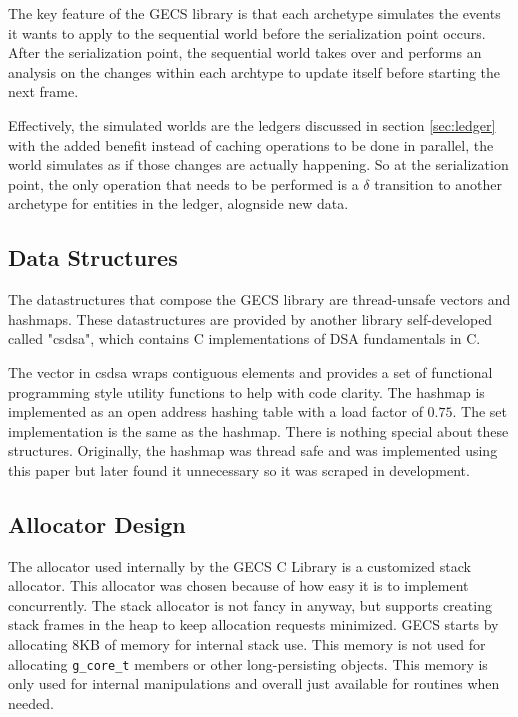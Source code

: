The key feature of the GECS library is that each archetype simulates the events it wants to apply to the sequential world before the serialization point occurs. After the serialization point, the sequential world takes over and performs an analysis on the changes within each archtype to update itself before starting the next frame.

Effectively, the simulated worlds are the ledgers discussed in section \ref{sec:ledger} with the added benefit instead of caching operations to be done in parallel, the world simulates as if those changes are actually happening. So at the serialization point, the only operation that needs to be performed is a $\delta$ transition to another archetype for entities in the ledger, alognside new data.

\subsection{Data Structures}
\label{sec:ds}
The datastructures that compose the GECS library are thread-unsafe vectors and hashmaps. These datastructures are provided by another library self-developed called "csdsa", which contains C implementations of DSA fundamentals in C. 

The vector in csdsa wraps contiguous elements and provides a set of functional programming style utility functions to help with code clarity. The hashmap is implemented as an open address hashing table with a load factor of $0.75$. The set implementation is the same as the hashmap. There is nothing special about these structures. Originally, the hashmap was thread safe and was implemented using this paper \cite{hashmaps} but later found it unnecessary so it was scraped in development. 

\subsection{Allocator Design}
The allocator used internally by the GECS C Library is a customized stack allocator. This allocator was chosen because of how easy it is to implement concurrently. The stack allocator is not fancy in anyway, but supports creating stack frames in the heap to keep allocation requests minimized. GECS starts by allocating 8KB of memory for internal stack use. This memory is not used for allocating \texttt{g\_core\_t} members or other long-persisting objects. This memory is only used for internal manipulations and overall just available for routines when needed.

